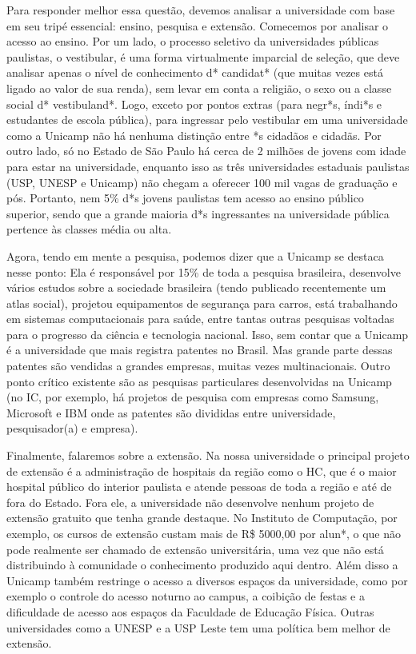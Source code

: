 Para responder melhor essa questão, devemos analisar a universidade com base em
seu tripé essencial: ensino, pesquisa e extensão. Comecemos por analisar o
acesso ao ensino. Por um lado, o processo seletivo da universidades públicas
paulistas, o vestibular, é uma forma virtualmente imparcial de seleção, que deve
analisar apenas o nível de conhecimento d* candidat* (que muitas vezes está
ligado ao valor de sua renda), sem levar em conta a religião, o sexo ou a classe
social d* vestibuland*. Logo, exceto por pontos extras (para negr*s, índi*s e
estudantes de escola pública), para ingressar pelo vestibular em uma
universidade como a Unicamp não há nenhuma distinção entre *s cidadãos e
cidadãs. Por outro lado, só no Estado de São Paulo há cerca de 2 milhões de
jovens com idade para estar na universidade, enquanto isso as três universidades
estaduais paulistas (USP, UNESP e Unicamp) não chegam a oferecer 100 mil vagas
de graduação e pós. Portanto, nem 5\% d*s jovens paulistas tem acesso ao ensino
público superior, sendo que a grande maioria d*s ingressantes na universidade
pública pertence às classes média ou alta.

Agora, tendo em mente a pesquisa, podemos dizer que a Unicamp se destaca nesse
ponto: Ela é responsável por 15\% de toda a pesquisa brasileira, desenvolve
vários estudos sobre a sociedade brasileira (tendo publicado recentemente um
atlas social), projetou equipamentos de segurança para carros, está trabalhando
em sistemas computacionais para saúde, entre tantas outras pesquisas voltadas
para o progresso da ciência e tecnologia nacional. Isso, sem contar que a
Unicamp é a universidade que mais registra patentes no Brasil. Mas grande parte
dessas patentes são vendidas a grandes empresas, muitas vezes multinacionais.
Outro ponto crítico existente são as pesquisas particulares desenvolvidas na
Unicamp (no IC, por exemplo, há projetos de pesquisa com empresas como Samsung,
Microsoft e IBM onde as patentes são divididas entre universidade,
pesquisador(a) e empresa).

Finalmente, falaremos sobre a extensão. Na nossa universidade o principal
projeto de extensão é a administração de hospitais da região como o HC, que é o
maior hospital público do interior paulista e atende pessoas de toda a região e
até de fora do Estado. Fora ele, a universidade não desenvolve nenhum projeto de
extensão gratuito que tenha grande destaque. No Instituto de Computação, por
exemplo, os cursos de extensão custam mais de R\$ 5000,00 por alun*, o que não
pode realmente ser chamado de extensão universitária, uma vez que não está
distribuindo à comunidade o conhecimento produzido aqui dentro.  Além disso a
Unicamp também restringe o acesso a diversos espaços da universidade, como por
exemplo o controle do acesso noturno ao campus, a coibição de festas e a
dificuldade de acesso aos espaços da Faculdade de Educação Física. Outras
universidades como a UNESP e a USP Leste tem uma política bem melhor de
extensão.

